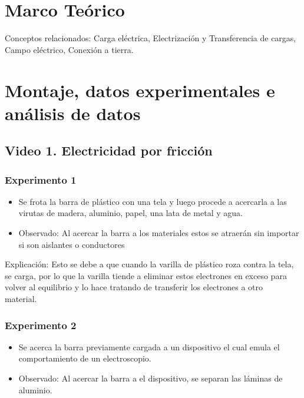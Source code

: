 \documentclass[letterpaper, 12pt]{report}
\begin{document}
\section{Marco Teórico}

Conceptos relacionados: Carga eléctrica, Electrización y Transferencia de 
cargas, Campo eléctrico, Conexión a tierra.

\section{Montaje, datos experimentales e análisis de datos}

\subsection{Video 1. Electricidad por fricción}

\subsubsection{Experimento 1}

\begin{itemize}
	\item Se frota la barra de plástico con una tela y luego procede a
	      acercarla a las  virutas de madera, aluminio, papel, una lata de
	      metal y agua.

	\item Observado: Al acercar la barra a los materiales estos se atraerán
	      sin importar si son aislantes o conductores
\end{itemize}

Explicación: Esto se debe a que cuando la varilla de plástico roza contra la
tela, se carga, por lo que la varilla tiende a eliminar estos electrones en
exceso para volver al equilibrio y lo hace tratando de transferir los
electrones  a otro material.~\cite{GenerarCargaElectrica}

\subsubsection{Experimento 2}

\begin{itemize}
	\item Se acerca la barra previamente cargada a un dispositivo el cual
	      emula el comportamiento de un electroscopio.

	\item Observado: Al acercar la barra a el dispositivo, se separan las
	      láminas de aluminio.
\end{itemize}
\end{document}
